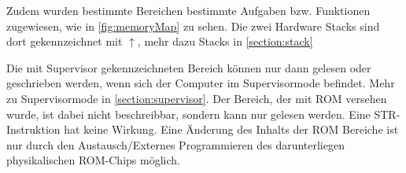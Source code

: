 \documentclass{scrartcl}
\begin{document}





Zudem wurden bestimmte Bereichen bestimmte Aufgaben bzw. Funktionen zugewiesen, wie in \autoref{fig:memoryMap} zu sehen.
Die zwei Hardware Stacks sind dort gekennzeichnet mit $\uparrow$, mehr dazu Stacks in \autoref{section:stack}

Die mit Supervisor gekennzeichneten Bereich können nur dann gelesen oder geschrieben werden, wenn sich der Computer im Supervisormode befindet.
Mehr zu Supervisormode in \autoref{section:supervisor}.
Der Bereich, der mit ROM versehen wurde, ist dabei nicht beschreibbar, sondern kann nur gelesen werden.
Eine STR-Instruktion hat keine Wirkung.
Eine Änderung des Inhalts der ROM Bereiche ist nur durch den Austausch/Externes Programmieren des darunterliegen physikalischen ROM-Chips möglich.
\end{document}
